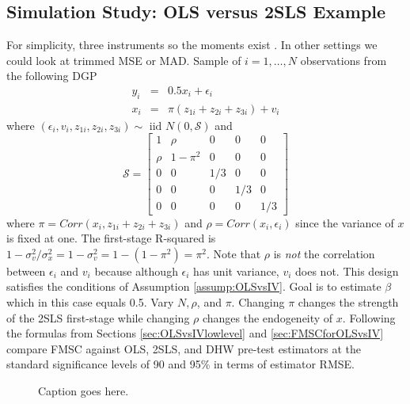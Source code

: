 \subsection{Simulation Study: OLS versus 2SLS Example}
\label{sec:OLSvsIVsim}
For simplicity, three instruments so the moments exist \citep{Phillips1980}. 
In other settings we could look at trimmed MSE or MAD.
Sample of $i = 1, \hdots, N$ observations from the following DGP 
\begin{eqnarray}
	y_i &=& 0.5 x_i + \epsilon_i\\
	x_i &=& \pi(z_{1i} + z_{2i} + z_{3i}) + v_i
\end{eqnarray}
where $(\epsilon_i, v_i, z_{1i}, z_{2i}, z_{3i}) \sim \mbox{ iid } N(0, \mathcal{S})$ and
\begin{equation}
	\mathcal{S} = \left[ \begin{array}
		{ccccc} 
		1 & \rho & 0 & 0 & 0\\
		\rho & 1 - \pi^2 & 0 & 0 & 0\\
		0 & 0 & 1/3 & 0 & 0\\
		0 & 0 & 0 & 1/3 & 0 \\
		0 & 0 & 0 & 0 & 1/3
	\end{array}\right]
\end{equation}
where $\pi = Corr(x_i, z_{1i} + z_{2i} + z_{3i})$ and $\rho = Corr(x_i,\epsilon_i)$ since the variance of $x$ is fixed at one.
The first-stage R-squared is $1 - \sigma_v^2/\sigma_x^2 = 1 - \sigma_v^2 = 1 - (1 - \pi^2) = \pi^2$.
Note that $\rho$ is \emph{not} the correlation between $\epsilon_i$ and $v_i$ because although $\epsilon_i$ has unit variance, $v_i$ does not.
This design satisfies the conditions of Assumption \ref{assump:OLSvsIV}.
Goal is to estimate $\beta$ which in this case equals 0.5.
Vary $N, \rho$, and $\pi$.
Changing $\pi$ changes the strength of the 2SLS first-stage while changing $\rho$ changes the endogeneity of $x$.
Following the formulas from Sections \ref{sec:OLSvsIVlowlevel} and \ref{sec:FMSCforOLSvsIV} compare FMSC against OLS, 2SLS, and DHW pre-test estimators at the standard significance levels of 90 and 95\% in terms of estimator RMSE.

\begin{figure}
\centering
	
	\caption{Caption goes here.}
\end{figure}

